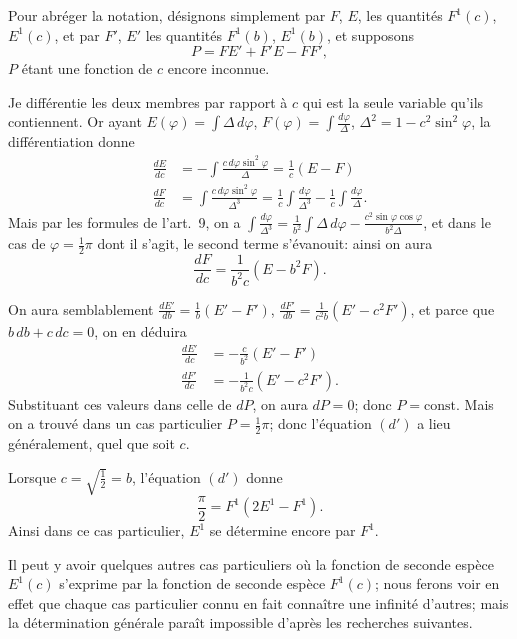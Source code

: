 \documentclass{article}
\begin{document}
Pour abréger la notation, désignons simplement par $F$, $E$, les quantités $F^{1}(c)$, $E^{1}(c)$, et par $F'$, $E'$ les quantités $F^{1}(b)$, $E^{1}(b)$, et supposons
\[ P=FE'+F'E-FF', \]
$P$ étant une fonction de $c$ encore inconnue.

Je différentie les deux membres par rapport à $c$ qui est la seule variable qu'ils contiennent. Or ayant $E(\varphi)=\displaystyle\int\Delta\,d\varphi$, $F(\varphi)=\displaystyle\int\frac{d\varphi}{\Delta}$, $\Delta^{2}=1-c^{2}\sin^{2}\varphi$, la différentiation donne
\[ \begin{aligned} \frac{dE}{dc}&=-\int\frac{c\,d\varphi\sin^{2}\varphi}{\Delta}=\frac{1}{c}(E-F)\\ \frac{dF}{dc}&=\int\frac{c\,d\varphi\sin^{2}\varphi}{\Delta^{3}}=\frac{1}{c}\int\frac{d\varphi}{\Delta^{3}}-\frac{1}{c}\int\frac{d\varphi}{\Delta}. \end{aligned} \]
Mais par les formules de l'art.\ 9, on a $\displaystyle\int\frac{d\varphi}{\Delta^{3}}=\frac{1}{b^{2}}\displaystyle\int\Delta\,d\varphi-\frac{c^{2}\sin\varphi\cos\varphi}{b^{2}\Delta}$, et dans le cas de $\varphi=\frac{1}{2}\pi$ dont il s'agit, le second terme s'évanouit: ainsi on aura
\[ \frac{dF}{dc}=\frac{1}{b^{2}c}(E-b^{2}F). \]

On aura semblablement $\frac{dE'}{db}=\frac{1}{b}(E'-F')$, $\frac{dF'}{db}=\frac{1}{c^{2}b}(E'-c^{2}F')$, et parce que $b\,db+c\,dc=0$, on en déduira
\[ \begin{aligned} \frac{dE'}{dc}&=-\frac{c}{b^{2}}(E'-F')\\ \frac{dF'}{dc}&=-\frac{1}{b^{2}c}(E'-c^{2}F'). \end{aligned} \]
Substituant ces valeurs dans celle de $dP$, on aura $dP=0$; donc $P=\text{const.}$ Mais on a trouvé dans un cas particulier $P=\frac{1}{2}\pi$; donc l'équation $(d')$ a lieu généralement, quel que soit $c$.

Lorsque $c=\sqrt{\frac{1}{2}}=b$, l'équation $(d')$ donne
\[ \frac{\pi}{2}=F^{1}(2E^{1}-F^{1}). \]
Ainsi dans ce cas particulier, $E^{1}$ se détermine encore par $F^{1}$.

Il peut y avoir quelques autres cas particuliers où la fonction de seconde espèce $E^{1}(c)$ s'exprime par la fonction de seconde espèce $F^{1}(c)$; nous ferons voir en effet que chaque cas particulier connu en fait connaître une infinité d'autres; mais la détermination générale paraît impossible d'après les recherches suivantes.
\end{document}
